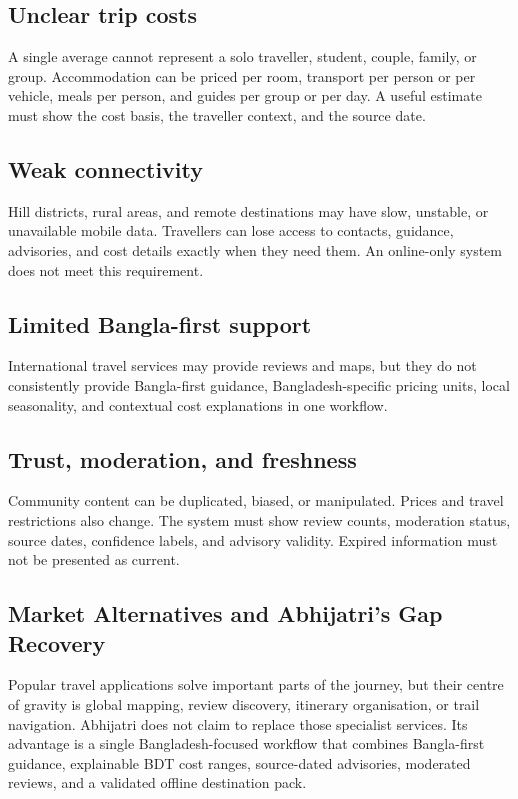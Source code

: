 \documentclass[11pt,a4paper]{article}
\begin{document}
\subsection{Unclear trip costs}
A single average cannot represent a solo traveller, student, couple, family, or group. Accommodation can be priced per room, transport per person or per vehicle, meals per person, and guides per group or per day. A useful estimate must show the cost basis, the traveller context, and the source date.

\subsection{Weak connectivity}
Hill districts, rural areas, and remote destinations may have slow, unstable, or unavailable mobile data. Travellers can lose access to contacts, guidance, advisories, and cost details exactly when they need them. An online-only system does not meet this requirement.

\subsection{Limited Bangla-first support}
International travel services may provide reviews and maps, but they do not consistently provide Bangla-first guidance, Bangladesh-specific pricing units, local seasonality, and contextual cost explanations in one workflow.

\subsection{Trust, moderation, and freshness}
Community content can be duplicated, biased, or manipulated. Prices and travel restrictions also change. The system must show review counts, moderation status, source dates, confidence labels, and advisory validity. Expired information must not be presented as current.

\clearpage
\subsection{Market Alternatives and Abhijatri's Gap Recovery}\label{sec:market-gap}
Popular travel applications solve important parts of the journey, but their centre of gravity is global mapping, review discovery, itinerary organisation, or trail navigation. Abhijatri does not claim to replace those specialist services. Its advantage is a single Bangladesh-focused workflow that combines Bangla-first guidance, explainable BDT cost ranges, source-dated advisories, moderated reviews, and a validated offline destination pack.
\end{document}
